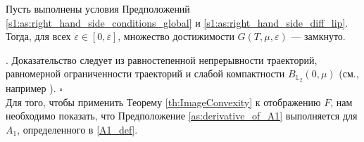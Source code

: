 \documentclass[../main.tex]{subfiles}
\begin{document}
\begin{utv}\label{ReachableSetcloseness}
    Пусть выполнены условия Предположений \ref{s1:as:right_hand_side_conditions_global} и \ref{s1:as:right_hand_side_diff_lip}. 
Тогда, для всех $\varepsilon\in [0,\overline{\varepsilon}]$, множество достижимости $G(T,\mu,\varepsilon) $ --- замкнуто.
\end{utv}
\doc. 
Доказательство следует из равностепенной непрерывности траекторий, равномерной ограниченности траекторий и слабой компактности $B_{\mathbb{L}_2}(0,\mu)$ (см., например \cite{GusZyk}).
\hfill$\square$\\[1ex]%

Для того, чтобы применить Теорему \ref{th:ImageConvexity} к отображению $F$,  нам необходимо показать, что Предположение \ref{as:derivative_of_A1} выполняется для $A_1$, определенного в \eqref{A1_def}.
\end{document}
